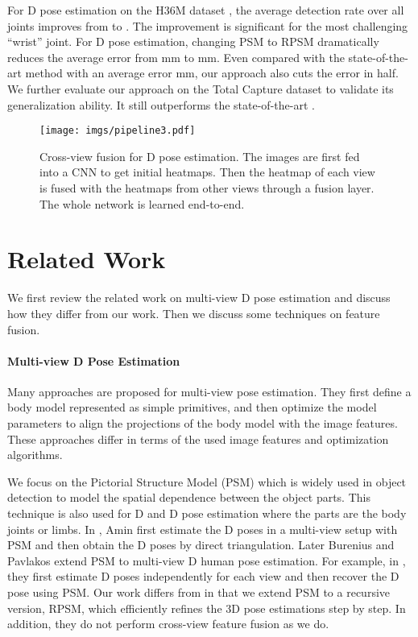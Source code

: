 \documentclass[10pt,twocolumn,letterpaper]{article}
\begin{document}
For D pose estimation on the H36M dataset \cite{ionescu2014human3}, the average detection rate over all joints improves from  to . The improvement is significant for the most challenging ``wrist'' joint. For D pose estimation, changing PSM to RPSM dramatically reduces the average error from mm to mm. Even compared with the state-of-the-art method with an average error mm, our approach also cuts the error in half. We further evaluate our approach on the Total Capture dataset \cite{trumble2017total} to validate its generalization ability. It still outperforms the state-of-the-art \cite{trumble2018deep}.

\begin{figure}
	\centering
	\texttt{[image: imgs/pipeline3.pdf]}
	\caption{Cross-view fusion for D pose estimation. The images are first fed into a CNN to get initial heatmaps. Then the heatmap of each view is fused with the heatmaps from other views through a fusion layer.  The whole network is learned end-to-end.}
	\label{fig:pipeline}
\end{figure}

\section{Related Work}
We first review the related work on multi-view D pose estimation and discuss how they differ from our work. Then we discuss some techniques on feature fusion. 

\paragraph{Multi-view D Pose Estimation} Many approaches \cite{liu2011markerless,gall2010optimization,burenius20133D,PavlakosZDD17,belagiannis20143D,Rhodin_2018_ECCV,rhodin2018learning} are proposed for multi-view pose estimation. They first define a body model represented as simple primitives, and then optimize the model parameters to align the projections of the body model with the image features. These approaches differ in terms of the used image features and optimization algorithms.


We focus on the Pictorial Structure Model (PSM) which is widely used in object detection \cite{felzenszwalb2005pictorial,fischler1973representation} to model the spatial dependence between the object parts. This technique is also used for D \cite{yang2011articulated,chen2014articulated,amin2013multi} and D \cite{burenius20133D,PavlakosZDD17} pose estimation where the parts are the body joints or limbs. In \cite{amin2013multi}, Amin \etal first estimate the D poses in a multi-view setup with PSM and then obtain the D poses by direct triangulation. Later Burenius \etal \cite{burenius20133D} and Pavlakos \etal \cite{PavlakosZDD17} extend PSM to multi-view D human pose estimation. For example, in \cite{PavlakosZDD17}, they first estimate D poses independently for each view and then recover the D pose using PSM. Our work differs from \cite{PavlakosZDD17} in that we extend PSM to a recursive version, \ie RPSM, which efficiently refines the 3D pose estimations step by step. In addition, they \cite{PavlakosZDD17} do not perform cross-view feature fusion as we do.
\end{document}
